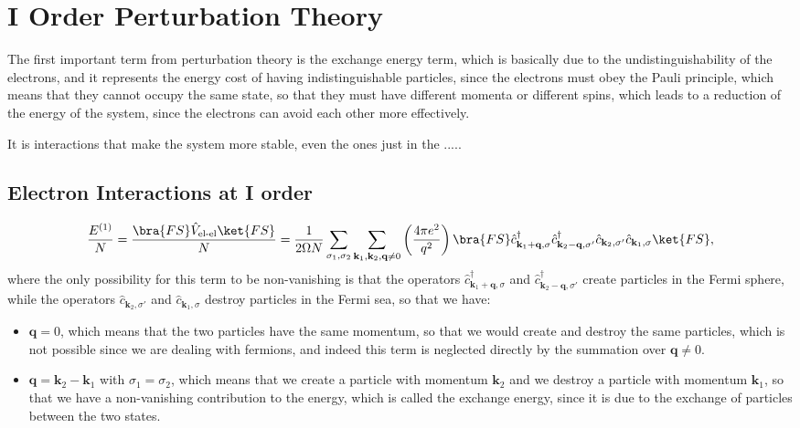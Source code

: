 \section{I Order Perturbation Theory}


The first important term from perturbation theory is the exchange energy term, which is basically due to the undistinguishability of the electrons, and it represents the energy cost of having indistinguishable particles, since the electrons must obey the Pauli principle, which means that they cannot occupy the same state, so that they must have different momenta or different spins, which leads to a reduction of the energy of the system, since the electrons can avoid each other more effectively.

It is interactions that make the system more stable, even the ones just in the .....


\subsection{Electron Interactions at I order}

\[
    \frac{E^{(1)}}{N} = \frac{\bra{FS} \hat{V}_{\text{el-el}}\ket{FS}}{N} = \frac{1}{2\Omega N} \sum_{\sigma_1, \sigma_2} \sum_{\mathbf{k}_1, \mathbf{k}_2, \mathbf{q}\neq 0} \left( \frac{4 \pi e^2}{q^2} \right) \bra{FS} \hat{c}_{\mathbf{k}_1 + \mathbf{q}, \sigma}^\dagger \hat{c}_{\mathbf{k}_2 - \mathbf{q}, \sigma'}^\dagger \hat{c}_{\mathbf{k}_2, \sigma'} \hat{c}_{\mathbf{k}_1, \sigma} \ket{FS},
\]
where the only possibility for this term to be non-vanishing is that the operators \(\hat{c}_{\mathbf{k}_1 + \mathbf{q}, \sigma}^\dagger\) and \(\hat{c}_{\mathbf{k}_2 - \mathbf{q}, \sigma'}^\dagger\) create particles in the Fermi sphere, while the operators \(\hat{c}_{\mathbf{k}_2, \sigma'}\) and \(\hat{c}_{\mathbf{k}_1, \sigma}\) destroy particles in the Fermi sea, so that we have:
\begin{itemize}
    \item \(\mathbf{q} = 0\), which means that the two particles have the same momentum, so that we would create and destroy the same particles, which is not possible since we are dealing with fermions, and indeed this term is neglected directly by the summation over \(\mathbf{q}\neq 0\).
    \item \(\mathbf{q} = \mathbf{k}_2 - \mathbf{k}_1\) with \(\sigma_1 = \sigma_2\), which means that we create a particle with momentum \(\mathbf{k}_2\) and we destroy a particle with momentum \(\mathbf{k}_1\), so that we have a non-vanishing contribution to the energy, which is called the exchange energy, since it is due to the exchange of particles between the two states.
\end{itemize}


